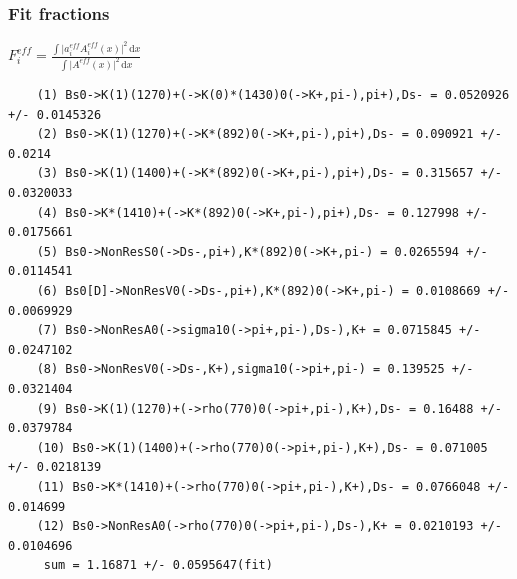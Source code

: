 \documentclass[]{beamer}
\begin{document}
\begin{frame}[fragile]
	\frametitle{Fit fractions}

	\centering
      $F^{eff}_i = \frac{\int  \vert a^{eff}_i  A^{eff}_i(x) \vert^2  \, \text{d}x}{\int  \vert A^{eff}(x) \vert^2 \, \text{d}x} $ \\


	\tiny
\begin{verbatim} 
	(1) Bs0->K(1)(1270)+(->K(0)*(1430)0(->K+,pi-),pi+),Ds- = 0.0520926 +/- 0.0145326
	(2) Bs0->K(1)(1270)+(->K*(892)0(->K+,pi-),pi+),Ds- = 0.090921 +/- 0.0214
	(3) Bs0->K(1)(1400)+(->K*(892)0(->K+,pi-),pi+),Ds- = 0.315657 +/- 0.0320033
	(4) Bs0->K*(1410)+(->K*(892)0(->K+,pi-),pi+),Ds- = 0.127998 +/- 0.0175661
	(5) Bs0->NonResS0(->Ds-,pi+),K*(892)0(->K+,pi-) = 0.0265594 +/- 0.0114541
	(6) Bs0[D]->NonResV0(->Ds-,pi+),K*(892)0(->K+,pi-) = 0.0108669 +/- 0.0069929
	(7) Bs0->NonResA0(->sigma10(->pi+,pi-),Ds-),K+ = 0.0715845 +/- 0.0247102
	(8) Bs0->NonResV0(->Ds-,K+),sigma10(->pi+,pi-) = 0.139525 +/- 0.0321404
	(9) Bs0->K(1)(1270)+(->rho(770)0(->pi+,pi-),K+),Ds- = 0.16488 +/- 0.0379784
	(10) Bs0->K(1)(1400)+(->rho(770)0(->pi+,pi-),K+),Ds- = 0.071005 +/- 0.0218139
	(11) Bs0->K*(1410)+(->rho(770)0(->pi+,pi-),K+),Ds- = 0.0766048 +/- 0.014699
	(12) Bs0->NonResA0(->rho(770)0(->pi+,pi-),Ds-),K+ = 0.0210193 +/- 0.0104696
	 sum = 1.16871 +/- 0.0595647(fit)
\end{verbatim}	
				
\end{frame}
\end{document}
